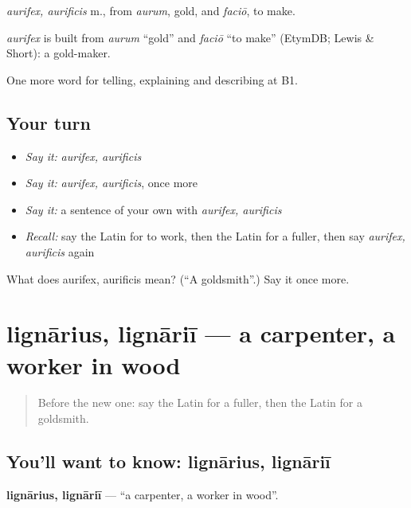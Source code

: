 \emph{aurifex, aurificis} m., from \emph{aurum}, gold, and \emph{faciō}, to make.

\begin{cousinweb}
\emph{aurifex} is built from \emph{aurum} \textquotedblleft{}gold\textquotedblright{} and \emph{faciō} \textquotedblleft{}to make\textquotedblright{} (EtymDB; Lewis \& Short): a gold-maker.
\end{cousinweb}

\begin{grammarlens}[title={What you've built}]
One more word for telling, explaining and describing at B1.
\end{grammarlens}

\subsection*{Your turn}
\begin{itemize}
\raggedright
  \item \emph{Say it:} \emph{aurifex, aurificis}
  \item \emph{Say it:} \emph{aurifex, aurificis}, once more
  \item \emph{Say it:} a sentence of your own with \emph{aurifex, aurificis}
  \item \emph{Recall:} say the Latin for to work, then the Latin for a fuller, then say \emph{aurifex, aurificis} again
\end{itemize}

\begin{tcolorbox}[breakable,colback=teal!4,colframe=teal!35!black,title={Before you move on}]
What does aurifex, aurificis mean? (\textquotedblleft{}A goldsmith\textquotedblright{}.) Say it once more.
\end{tcolorbox}
\section[lignārius, lignāriī]{lignārius, lignāriī — a carpenter, a worker in wood}

\label{lesson:LA-C377-lignarius}



\begin{quote}
Before the new one: say the Latin for a fuller, then the Latin for a goldsmith.
\end{quote}

\subsection*{You'll want to know: lignārius, lignāriī}
\textbf{lignārius, lignāriī} — \textquotedblleft{}a carpenter, a worker in wood\textquotedblright{}.

